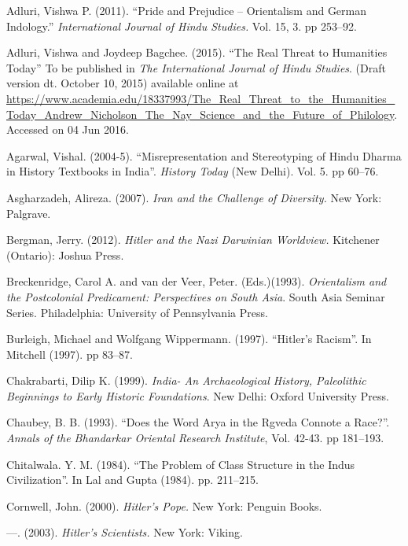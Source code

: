 \begin{thebibliography}{99}
\itemsep=0pt
 Adluri, Vishwa P. (2011). “Pride and Prejudice – Orientalism and German Indology.” \textit{International Journal of Hindu Studies.} Vol. 15, 3. pp 253--92.

  Adluri, Vishwa and Joydeep Bagchee. (2015). “The Real Threat to Humanities Today” To be published in \textit{The International Journal of Hindu Studies}. (Draft version dt. October 10, 2015) available online at \url{https://www.academia.edu/18337993/The_Real_Threat_to_the_Humanities_Today_Andrew_Nicholson_The_Nay_Science_and_the_Future_of_Philology}. Accessed on 04 Jun 2016.

  Agarwal, Vishal. (2004-5). “Misrepresentation and Stereotyping of Hindu Dharma in History Textbooks in India”. \textit{History Today} (New Delhi). Vol. 5. pp 60--76.

  Asgharzadeh, Alireza. (2007). \textit{Iran and the Challenge of Diversity. }New York: Palgrave.

  Bergman, Jerry. (2012). \textit{Hitler and the Nazi Darwinian Worldview.} Kitchener (Ontario): Joshua Press.

  Breckenridge, Carol A. and van der Veer, Peter. (Eds.)(1993). \textit{Orientalism and the Postcolonial Predicament: Perspectives on South Asia}. South Asia Seminar Series. Philadelphia: University of Pennsylvania Press.

  Burleigh, Michael and Wolfgang Wippermann. (1997). “Hitler’s Racism”. In Mitchell (1997). pp 83--87.

  Chakrabarti, Dilip K. (1999). \textit{India- An Archaeological History, Paleolithic Beginnings to Early Historic Foundations}. New Delhi: Oxford University Press.

  Chaubey, B. B. (1993). “Does the Word Arya in the Rgveda Connote a Race?”. \textit{Annals of the Bhandarkar Oriental Research Institute}, Vol. 42-43. pp 181--193.

  Chitalwala. Y. M. (1984). “The Problem of Class Structure in the Indus Civilization”. In Lal and Gupta (1984). pp. 211--215.

  Cornwell, John. (2000). \textit{Hitler’s Pope. }New York: Penguin Books.

  —. (2003). \textit{Hitler’s Scientists.} New York: Viking.


\end{thebibliography}
